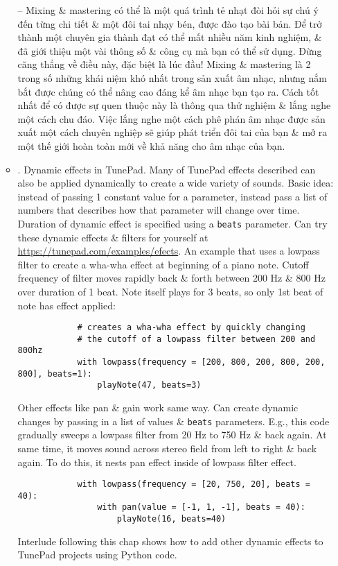 \documentclass{article}
\begin{document}
\begin{itemize}
\begin{itemize}
		-- Mixing \& mastering có thể là một quá trình tẻ nhạt đòi hỏi sự chú ý đến từng chi tiết \& một đôi tai nhạy bén, được đào tạo bài bản. Để trở thành một chuyên gia thành đạt có thể mất nhiều năm kinh nghiệm, \& đã giới thiệu một vài thông số \& công cụ mà bạn có thể sử dụng. Đừng căng thẳng về điều này, đặc biệt là lúc đầu! Mixing \& mastering là 2 trong số những khái niệm khó nhất trong sản xuất âm nhạc, nhưng nắm bắt được chúng có thể nâng cao đáng kể âm nhạc bạn tạo ra. Cách tốt nhất để có được sự quen thuộc này là thông qua thử nghiệm \& lắng nghe một cách chu đáo. Việc lắng nghe một cách phê phán âm nhạc được sản xuất một cách chuyên nghiệp sẽ giúp phát triển đôi tai của bạn \& mở ra một thế giới hoàn toàn mới về khả năng cho âm nhạc của bạn.
		\item {. Dynamic effects in TunePad.} Many of TunePad effects described can also be applied dynamically to create a wide variety of sounds. Basic idea: instead of passing 1 constant value for a parameter, instead pass a list of numbers that describes how that parameter will change over time. Duration of dynamic effect is specified using a {\tt beats} parameter. Can try these dynamic effects \& filters for yourself at \url{https://tunepad.com/examples/efects}. An example that uses a lowpass filter to create a wha-wha effect at beginning of a piano note. Cutoff frequency of filter moves rapidly back \& forth between 200 Hz \& 800 Hz over duration of 1 beat. Note itself plays for 3 beats, so only 1st beat of note has effect applied:
		\begin{verbatim}
			# creates a wha-wha effect by quickly changing
			# the cutoff of a lowpass filter between 200 and 800hz
			with lowpass(frequency = [200, 800, 200, 800, 200, 800], beats=1):
			    playNote(47, beats=3)
		\end{verbatim}
		Other effects like pan \& gain work same way. Can create dynamic changes by passing in a list of values \& {\tt beats} parameters. E.g., this code gradually sweeps a lowpass filter from 20 Hz to 750 Hz \& back again. At same time, it moves sound across stereo field from left to right \& back again. To do this, it nests pan effect inside of lowpass filter effect.
		\begin{verbatim}
			with lowpass(frequency = [20, 750, 20], beats = 40):
			    with pan(value = [-1, 1, -1], beats = 40):
			        playNote(16, beats=40)
		\end{verbatim}
		Interlude following this chap shows how to add other dynamic effects to TunePad projects using Python code.

\end{itemize}
\end{itemize}
\end{document}
